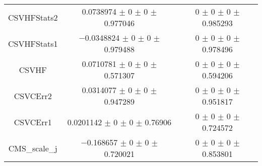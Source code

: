 \begin{table}
\begin{tabular}{ccc}
CSVHFStats2 & \num{0.0738974} $\pm$ \num{0} $\pm$ \num{0} $\pm$ \num{0.977046} & \num{0} $\pm$ \num{0} $\pm$ \num{0} $\pm$ \num{0.985293}\\
CSVHFStats1 & \num{-0.0348824} $\pm$ \num{0} $\pm$ \num{0} $\pm$ \num{0.979488} & \num{0} $\pm$ \num{0} $\pm$ \num{0} $\pm$ \num{0.978496}\\
CSVHF & \num{0.0710781} $\pm$ \num{0} $\pm$ \num{0} $\pm$ \num{0.571307} & \num{0} $\pm$ \num{0} $\pm$ \num{0} $\pm$ \num{0.594206}\\
CSVCErr2 & \num{0.0314077} $\pm$ \num{0} $\pm$ \num{0} $\pm$ \num{0.947289} & \num{0} $\pm$ \num{0} $\pm$ \num{0} $\pm$ \num{0.951817}\\
CSVCErr1 & \num{0.0201142} $\pm$ \num{0} $\pm$ \num{0} $\pm$ \num{0.76906} & \num{0} $\pm$ \num{0} $\pm$ \num{0} $\pm$ \num{0.724572}\\
CMS\_scale\_j & \num{-0.168657} $\pm$ \num{0} $\pm$ \num{0} $\pm$ \num{0.720021} & \num{0} $\pm$ \num{0} $\pm$ \num{0} $\pm$ \num{0.853801}\\
\bottomrule
\end{tabular}
\end{table}